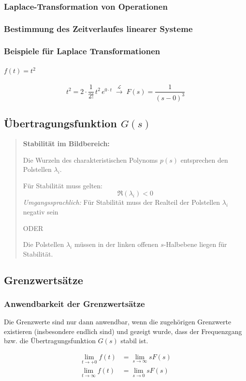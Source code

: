 \documentclass[12pt]{article}
\begin{document}
\subsubsection{Laplace-Transformation von Operationen}
\subsubsection{Bestimmung des Zeitverlaufes linearer Systeme}
\subsubsection{Beispiele für Laplace Transformationen}
\paragraph{\(f(t)=t^2\)}
\[
t^2 = 2\cdot \frac{1}{2!}\,t^2\,e^{0\cdot t}
\;\xrightarrow{\ \mathcal{L}\ }\;
F(s)=\frac{1}{(s-0)^3}
\]
\subsection{Übertragungsfunktion \(G(s)\)}
\begin{quote}
\textbf{Stabilität im Bildbereich:} 

Die Wurzeln des charakteristischen Polynoms \(p(s)\) entsprechen den Polstellen \(\lambda_i\).

Für Stabilität muss gelten:
\[
\Re(\lambda_i) < 0
\]
\emph{Umgangssprachlich:} Für Stabilität muss der Realteil der Polstellen  \(\lambda_i\) negativ sein 
\begin{center}
	ODER
\end{center}
Die Polstellen  \(\lambda_i\) müssen in der linken offenen \(s\)-Halbebene liegen für Stabilität.
\end{quote}
\subsection{Grenzwertsätze} 
\subsubsection{Anwendbarkeit der Grenzwertsätze} 
\noindent Die Grenzwerte sind nur dann anwendbar, wenn die zugehörigen Grenzwerte
existieren (insbesondere endlich sind) und gezeigt wurde, dass der
Frequenzgang bzw. die Übertragungsfunktion \(G(s)\) stabil ist.

\begin{align}
	\lim_{t\to+0} f(t) &= \lim_{s\to\infty} sF(s) \\
	\lim_{t\to\infty} f(t) &= \lim_{s\to0} sF(s)
\end{align}
\end{document}

